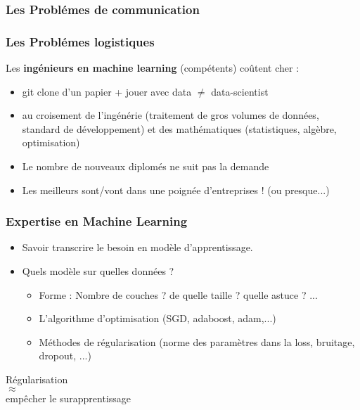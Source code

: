 \documentclass{formation}
\begin{document}
\begin{frame}
\frametitle{Les Problémes de communication}
\end{frame}

\begin{frame}
  \frametitle{Les Problémes logistiques}
  Les \textbf{ingénieurs en machine learning} (compétents) coûtent cher :
  \begin{itemize}
  \item git clone d'un papier + jouer avec data $\neq$ data-scientist
  \item au croisement de l'ingénérie (traitement de gros volumes de données, standard de développement) et des mathématiques (statistiques, algèbre, optimisation)
  \item Le nombre de nouveaux diplomés ne suit pas la demande
  \item Les meilleurs sont/vont dans une poignée d'entreprises ! (ou presque...)
  \end{itemize}
\end{frame}

\begin{frame}
  \frametitle{Expertise en Machine Learning}
  \begin{itemize}
    \item Savoir transcrire le besoin en modèle d'apprentissage.
    \item Quels modèle sur quelles données ?
      \begin{itemize}
      \item Forme : Nombre de couches ? de quelle taille ? quelle astuce ? ...
      \item L'algorithme d'optimisation (SGD, adaboost, adam,...)
      \item Méthodes de régularisation (norme des paramètres dans la loss, bruitage, dropout, ...)
      \end{itemize}
  \end{itemize}
  \begin{minipage}[l]{0.49\linewidth}
    \begin{center}
      Régularisation \\
      $\approx$\\
      empêcher le surapprentissage
    \end{center}
  \end{minipage}\hfill
  \begin{minipage}[l]{0.49\linewidth}
  \end{minipage}\hfill
\end{frame}
\end{document}
